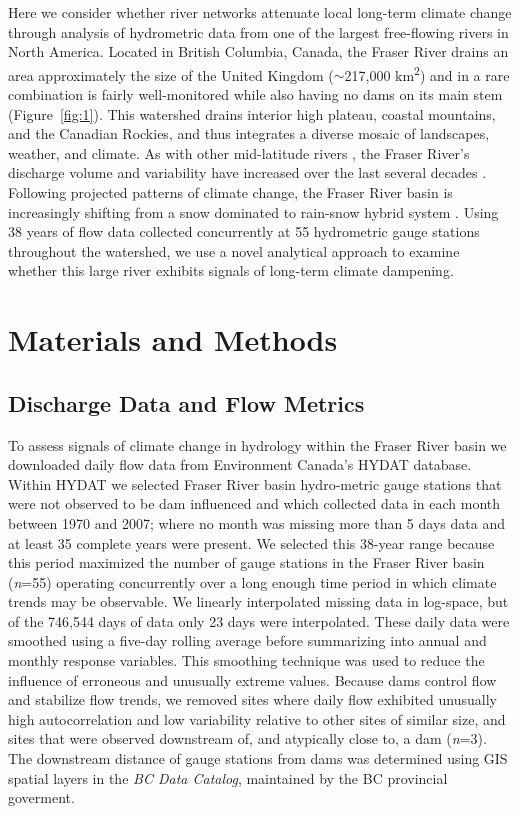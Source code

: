 \documentclass[draft,linenumbers]{AGUJournal}
\begin{document}
Here we consider whether river networks attenuate local long-term climate change through analysis of hydrometric data from one of the largest free-flowing rivers in North America. Located in British Columbia, Canada, the Fraser River drains an area approximately the size of the United Kingdom ($\sim$217,000 km\textsuperscript{2}) and in a rare combination is fairly well-monitored while also having no dams on its main stem \citep{Vorosmarty:2010} (Figure~\ref{fig:1}). This watershed drains interior high plateau, coastal mountains, and the Canadian Rockies, and thus integrates a diverse mosaic of landscapes, weather, and climate. As with other mid-latitude rivers \citep{Bindoff:2013}, the Fraser River's discharge volume and variability have increased over the last several decades \citep{Dery:2012,Morrison:2002}. Following projected patterns of climate change, the Fraser River basin is increasingly shifting from a snow dominated to rain-snow hybrid system \citep{Kang:2016}. Using 38 years of flow data collected concurrently at 55 hydrometric gauge stations throughout the watershed, we use a novel analytical approach to examine whether this large river exhibits signals of long-term climate dampening.

\section{Materials and Methods}

\subsection{Discharge Data and Flow Metrics}

	To assess signals of climate change in hydrology within the Fraser River basin we downloaded daily flow data from Environment Canada's HYDAT database. Within HYDAT we selected Fraser River basin hydro-metric gauge stations that were not observed to be dam influenced and which collected data in each month between 1970 and 2007; where no month was missing more than 5 days data and at least 35 complete years were present. We selected this 38-year range because this period maximized the number of gauge stations in the Fraser River basin (\textit{n}=55) operating concurrently over a long enough time period in which climate trends may be observable. We linearly interpolated missing data in log-space, but of the 746,544 days of data only 23 days were interpolated. These daily data were smoothed using a five-day rolling average before summarizing into annual and monthly response variables. This smoothing technique was used to reduce the influence of erroneous and unusually extreme values. Because dams control flow and stabilize flow trends, we removed sites where daily flow exhibited unusually high autocorrelation and low variability relative to other sites of similar size, and sites that were observed downstream of, and atypically close to, a dam (\textit{n}=3). The downstream distance of gauge stations from dams was determined using GIS spatial layers in the \textit{BC Data Catalog}, maintained by the BC provincial goverment.
\end{document}
